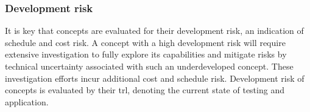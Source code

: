\subsubsection{Development risk}
It is key that concepts are evaluated for their development risk, an indication of schedule and cost risk. A concept with a high development risk will require extensive investigation to fully explore its capabilities and mitigate risks by technical uncertainty associated with such an underdeveloped concept. These investigation efforts incur additional cost and schedule risk. Development risk of concepts is evaluated by their \gls{trl}, denoting the current state of testing and application.



